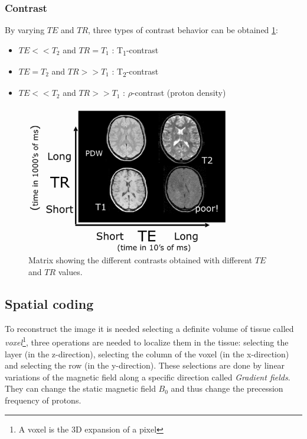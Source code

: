  \subsubsection*{Contrast}
 By varying $TE$ and $TR$, three types of contrast behavior can be obtained \ref{fig:matrixTR_TE}:
 \begin{itemize}
    \item $TE<<T_2$ and $TR=T_1$ : T\textsubscript{1}-contrast
    \item $TE=T_2$ and $TR>>T_1$ : T\textsubscript{2}-contrast
    \item $TE<<T_2$ and $TR>>T_1$ : $\rho$-contrast (proton density)
 \end{itemize}

 \begin{figure}[h]
    \centering
    \includegraphics[width=0.8\textwidth]{images/matrix_contrast.png}
    \caption{Matrix showing the different contrasts obtained with different $TE$ and $TR$ values. \cite{matrixContrast}}
    \label{fig:matrixTR_TE}
 \end{figure}

 \subsection{Spatial coding}
 To reconstruct the image it is needed selecting a definite volume of tissue called \emph{voxel}\footnote{A voxel is the 3D expansion of a pixel}, three operations are needed to localize them in the tissue: selecting the layer (in the z-direction), selecting the column of the voxel (in the x-direction) and selecting the row (in the y-direction).
 These selections are done by linear variations of the magnetic field along a specific direction called \emph{Gradient fields}. They can change the static magnetic field $B_0$ and thus change the precession frequency of protons.\\
 
